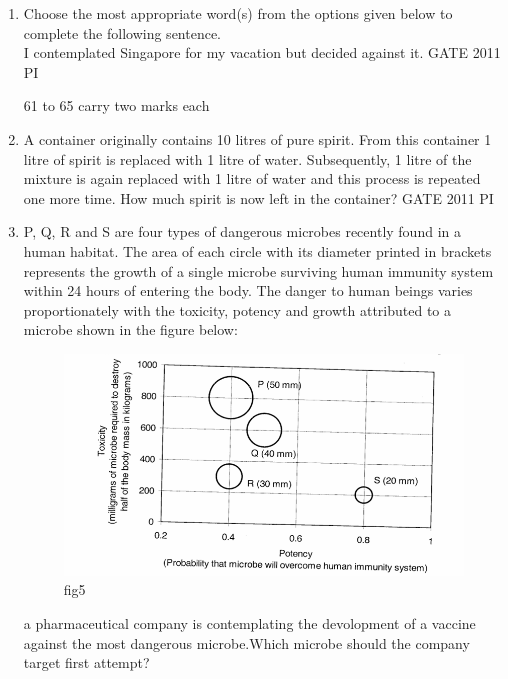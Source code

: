 \documentclass[journal,12pt,onecolumn]{IEEEtran}
\theoremstyle{remark}
\begin{document}
\begin{enumerate}
\item Choose the most appropriate word(s) from the options given below to complete the following sentence.\\
I contemplated \underline{\hspace{1.5cm}} Singapore for my vacation but decided against it.
\hfill{GATE 2011 PI}
\begin{enumerate}
\end{enumerate}
61 to 65 carry two marks each
\item A container originally contains 10 litres of pure spirit. From this container 1 litre of spirit is replaced with 1 litre of water. Subsequently, 1 litre of the mixture is again replaced with 1 litre of water and this process is repeated one more time. How much spirit is now left in the container?
\hfill{GATE 2011 PI}
\begin{enumerate}
\end{enumerate}
\item 
P, Q, R and S are four types of dangerous microbes recently found in a human habitat. The area of each circle with its diameter printed in brackets represents the growth of a single microbe surviving human immunity system within 24 hours of entering the body. The danger to human beings varies proportionately with the toxicity, potency and growth attributed to a microbe shown in the figure below:
\begin{figure}[H]
    \centering
    \includegraphics[width=0.5\linewidth]{figs/Q.62.png}
    \caption{fig5}
    \label{fig:figs/Q.62.png}
\end{figure}
a pharmaceutical company is contemplating the devolopment of a vaccine against the most dangerous microbe.Which microbe should the company target first attempt?


\end{enumerate}
\end{document}
